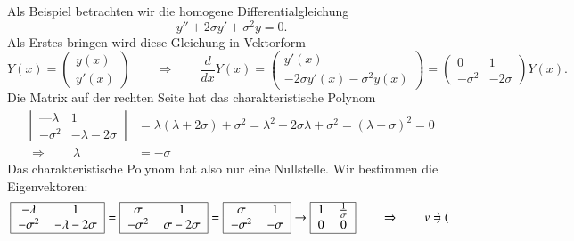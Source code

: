 \begin{beispiel}
Als Beispiel betrachten wir die homogene Differentialgleichung
\[
y''+2\sigma y'+\sigma^2y=0.
\]
Als Erstes bringen wird diese Gleichung in Vektorform 
\[
Y(x)=\begin{pmatrix}
y(x)\\y'(x)
\end{pmatrix}
\qquad\Rightarrow\qquad
\frac{d}{dx}Y(x)
=
\begin{pmatrix}
y'(x)\\
-2\sigma y'(x)-\sigma^2y(x)
\end{pmatrix}
=
\begin{pmatrix}
0&1\\
-\sigma^2& -2\sigma
\end{pmatrix}
Y(x).
\]
Die Matrix auf der rechten Seite hat das charakteristische Polynom
\begin{align*}
\left|\,\begin{matrix}
—\lambda&1\\
-\sigma^2&-\lambda-2\sigma
\end{matrix}\,\right|
&=
\lambda(\lambda+2\sigma)+\sigma^2
=
\lambda^2+2\sigma\lambda+\sigma^2=(\lambda+\sigma)^2=0
\\
\Rightarrow\qquad
\lambda&=-\sigma
\end{align*}
Das charakteristische Polynom hat also nur eine Nullstelle.
Wir bestimmen die Eigenvektoren:
\begin{align*}
\begin{tabular}{|>{$}c<{$}>{$}c<{$}|}
\hline
-\lambda & 1\\
-\sigma^2&-\lambda-2\sigma\\
\hline
\end{tabular}
&=
\begin{tabular}{|>{$}c<{$}>{$}c<{$}|}
\hline
\sigma & 1\\
-\sigma^2&\sigma-2\sigma\\
\hline
\end{tabular}
=
\begin{tabular}{|>{$}c<{$}>{$}c<{$}|}
\hline
\sigma & 1\\
-\sigma^2&-\sigma\\
\hline
\end{tabular}
\rightarrow
\begin{tabular}{|>{$}c<{$}>{$}c<{$}|}
\hline
1&\frac1{\sigma}\\
0&0\\
\hline
\end{tabular}
\qquad\Rightarrow\qquad
v=
\begin{pmatrix}

\end{pmatrix}
\end{align*}
\end{beispiel}
